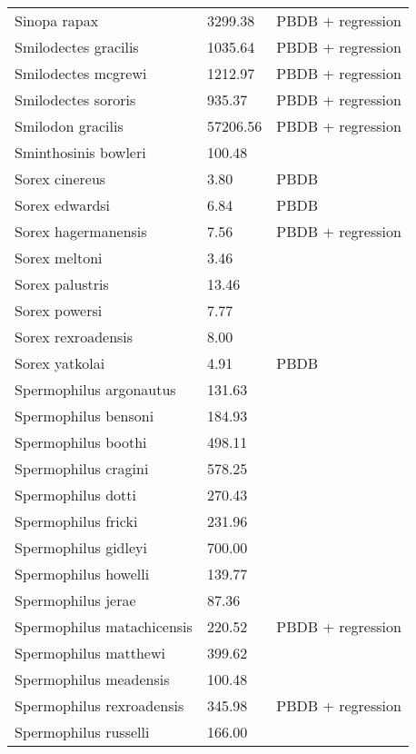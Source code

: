 \begin{center}
\begin{longtable}{p{} p{} p{} }
  Sinopa rapax & 3299.38 & PBDB + regression \\ 
  Smilodectes gracilis & 1035.64 & PBDB + regression \\ 
  Smilodectes mcgrewi & 1212.97 & PBDB + regression \\ 
  Smilodectes sororis & 935.37 & PBDB + regression \\ 
  Smilodon gracilis & 57206.56 & PBDB + regression \\ 
  Sminthosinis bowleri & 100.48 & \cite{Tomiya2013} \\ 
  Sorex cinereus & 3.80 & PBDB \\ 
  Sorex edwardsi & 6.84 & PBDB \\ 
  Sorex hagermanensis & 7.56 & PBDB + regression \\ 
  Sorex meltoni & 3.46 & \cite{Tomiya2013} \\ 
  Sorex palustris & 13.46 & \cite{Smith2004} \\ 
  Sorex powersi & 7.77 & \cite{Tomiya2013} \\ 
  Sorex rexroadensis & 8.00 & \cite{McKenna2011} \\ 
  Sorex yatkolai & 4.91 & PBDB \\ 
  Spermophilus argonautus & 131.63 & \cite{Tomiya2013} \\ 
  Spermophilus bensoni & 184.93 & \cite{Tomiya2013} \\ 
  Spermophilus boothi & 498.11 & \cite{Secord2008a} \\ 
  Spermophilus cragini & 578.25 & \cite{Tomiya2013} \\ 
  Spermophilus dotti & 270.43 & \cite{Tomiya2013} \\ 
  Spermophilus fricki & 231.96 & \cite{Simons1960} \\ 
  Spermophilus gidleyi & 700.00 & \cite{McKenna2011} \\ 
  Spermophilus howelli & 139.77 & \cite{Tomiya2013} \\ 
  Spermophilus jerae & 87.36 & \cite{Tomiya2013} \\ 
  Spermophilus matachicensis & 220.52 & PBDB + regression \\ 
  Spermophilus matthewi & 399.62 & \cite{Beatty2009} \\ 
  Spermophilus meadensis & 100.48 & \cite{Tomiya2013} \\ 
  Spermophilus rexroadensis & 345.98 & PBDB + regression \\ 
  Spermophilus russelli & 166.00 & \cite{McKenna2011} \\ 

\end{longtable}
\end{center}
